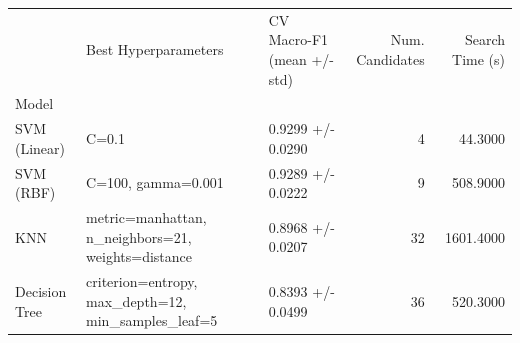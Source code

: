 \begin{tabular}{lllrr}
\toprule
 & Best Hyperparameters & CV Macro-F1 (mean +/- std) & Num. Candidates & Search Time (s) \\
Model &  &  &  &  \\
\midrule
SVM (Linear) & C=0.1 & 0.9299 +/- 0.0290 & 4 & 44.3000 \\
SVM (RBF) & C=100, gamma=0.001 & 0.9289 +/- 0.0222 & 9 & 508.9000 \\
KNN & metric=manhattan, n_neighbors=21, weights=distance & 0.8968 +/- 0.0207 & 32 & 1601.4000 \\
Decision Tree & criterion=entropy, max_depth=12, min_samples_leaf=5 & 0.8393 +/- 0.0499 & 36 & 520.3000 \\
\bottomrule
\end{tabular}

